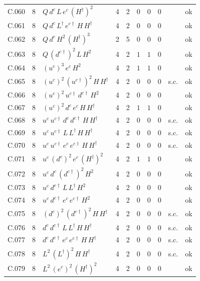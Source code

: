 {\begin{longtable}{@{}ll>{\raggedright\arraybackslash}p{6.4cm}rrllllr@{}}
C.060 & 8 & $Q\,d^c\,L\,e^c\,(H^\dagger)^{2}$ & 4 & 2 & $0$ & $0$ & $0$ &  & ok \\
C.061 & 8 & $Q\,d^c\,L^\dagger\,e^{c\dagger}\,H\,H^\dagger$ & 4 & 2 & $0$ & $0$ & $0$ &  & ok \\
C.062 & 8 & $Q\,d^c\,H^{2}\,(H^\dagger)^{3}$ & 2 & 5 & $0$ & $0$ & $0$ &  & ok \\
C.063 & 8 & $Q\,(d^{c\dagger})^{2}\,L\,H^{2}$ & 4 & 2 & $1$ & $1$ & $0$ &  & ok \\
C.064 & 8 & $(u^c)^{3}\,e^c\,H^{2}$ & 4 & 2 & $1$ & $1$ & $0$ &  & ok \\
C.065 & 8 & $(u^c)^{2}\,(u^{c\dagger})^{2}\,H\,H^\dagger$ & 4 & 2 & $0$ & $0$ & $0$ & s.c. & ok \\
C.066 & 8 & $(u^c)^{2}\,u^{c\dagger}\,d^{c\dagger}\,H^{2}$ & 4 & 2 & $0$ & $0$ & $0$ &  & ok \\
C.067 & 8 & $(u^c)^{2}\,d^c\,e^c\,H\,H^\dagger$ & 4 & 2 & $1$ & $1$ & $0$ &  & ok \\
C.068 & 8 & $u^c\,u^{c\dagger}\,d^c\,d^{c\dagger}\,H\,H^\dagger$ & 4 & 2 & $0$ & $0$ & $0$ & s.c. & ok \\
C.069 & 8 & $u^c\,u^{c\dagger}\,L\,L^\dagger\,H\,H^\dagger$ & 4 & 2 & $0$ & $0$ & $0$ & s.c. & ok \\
C.070 & 8 & $u^c\,u^{c\dagger}\,e^c\,e^{c\dagger}\,H\,H^\dagger$ & 4 & 2 & $0$ & $0$ & $0$ & s.c. & ok \\
C.071 & 8 & $u^c\,(d^c)^{2}\,e^c\,(H^\dagger)^{2}$ & 4 & 2 & $1$ & $1$ & $0$ &  & ok \\
C.072 & 8 & $u^c\,d^c\,(d^{c\dagger})^{2}\,H^{2}$ & 4 & 2 & $0$ & $0$ & $0$ &  & ok \\
C.073 & 8 & $u^c\,d^{c\dagger}\,L\,L^\dagger\,H^{2}$ & 4 & 2 & $0$ & $0$ & $0$ &  & ok \\
C.074 & 8 & $u^c\,d^{c\dagger}\,e^c\,e^{c\dagger}\,H^{2}$ & 4 & 2 & $0$ & $0$ & $0$ &  & ok \\
C.075 & 8 & $(d^c)^{2}\,(d^{c\dagger})^{2}\,H\,H^\dagger$ & 4 & 2 & $0$ & $0$ & $0$ & s.c. & ok \\
C.076 & 8 & $d^c\,d^{c\dagger}\,L\,L^\dagger\,H\,H^\dagger$ & 4 & 2 & $0$ & $0$ & $0$ & s.c. & ok \\
C.077 & 8 & $d^c\,d^{c\dagger}\,e^c\,e^{c\dagger}\,H\,H^\dagger$ & 4 & 2 & $0$ & $0$ & $0$ & s.c. & ok \\
C.078 & 8 & $L^{2}\,(L^\dagger)^{2}\,H\,H^\dagger$ & 4 & 2 & $0$ & $0$ & $0$ & s.c. & ok \\
C.079 & 8 & $L^{2}\,(e^c)^{2}\,(H^\dagger)^{2}$ & 4 & 2 & $0$ & $0$ & $0$ &  & ok \\

\end{longtable}}
